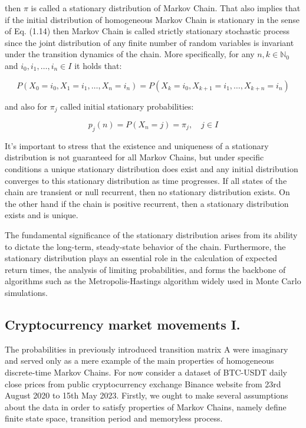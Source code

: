 then $\pi$ is called a stationary distribution of Markov Chain. That also implies that if the initial distribution of homogeneous Markov Chain is stationary in the sense of Eq. (1.14)
then Markov Chain is called strictly stationary stochastic process since the joint distribution of any finite number of random variables is invariant under the transition dynamics of the chain.
More specifically, for any $n,k \in \mathbb{N}_0$ and $i_0,i_1,\ldots,i_n \in I$ it holds that:

\begin{equation}
    P(X_0=i_0,X_1=i_1,\ldots,X_n=i_n) = P(X_k=i_0,X_{k+1}=i_1,\ldots,X_{k+n}=i_n)
\end{equation}

and also for $\pi_j$ called initial stationary probabilities:

\begin{equation} \label{eq:stationary}
    p_j(n) = P(X_n = j) = \pi_j, \quad j \in I
\end{equation}

It's important to stress that the existence and uniqueness of a stationary distribution 
is not guaranteed for all Markov Chains, but under specific conditions a unique stationary 
distribution does exist and any initial distribution converges to this stationary distribution as time progresses.
If all states of the chain are transient or null recurrent, then no stationary distribution exists. On the other hand if the chain is
positive recurrent, then a stationary distribution exists and is unique.
 
The fundamental significance of the stationary distribution arises from its ability to dictate the long-term, 
steady-state behavior of the chain. Furthermore, the stationary distribution plays an essential role in the 
calculation of expected return times, the analysis of limiting probabilities, and forms the backbone of
algorithms such as the Metropolis-Hastings algorithm widely used in Monte Carlo simulations.

\subsection{Cryptocurrency market movements I.}

The probabilities in previously introduced transition matrix A were imaginary and served only as a mere example of the main properties of homogeneous discrete-time Markov Chains. 
For now consider a dataset of BTC-USDT daily close prices from public cryptocurrency exchange Binance website from 23rd August 2020 to 15th May 2023. 
Firstly, we ought to make several assumptions about the data in order to satisfy properties of Markov Chains, namely define finite state space, transition period and memoryless process. 

